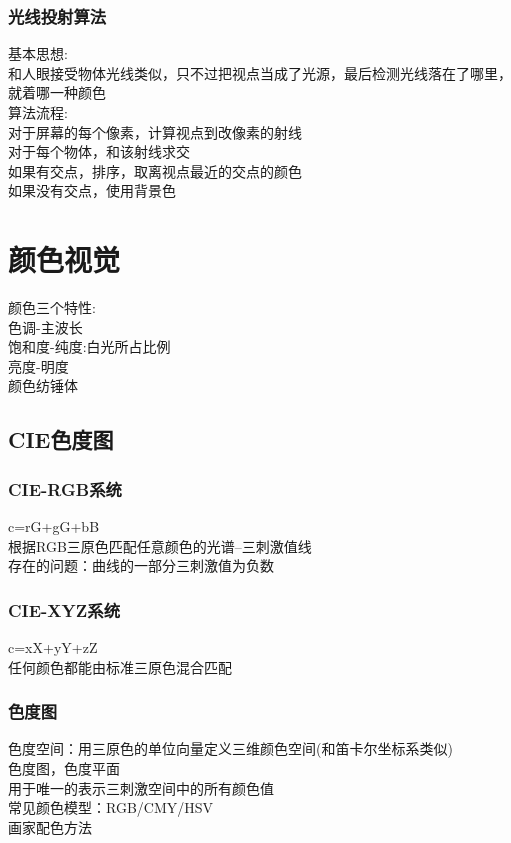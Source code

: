 \documentclass{article}
\begin{document}
\begin{CJK}{UTF8}{gbsn}
	\subsubsection{光线投射算法}
	基本思想:\\
	和人眼接受物体光线类似，只不过把视点当成了光源，最后检测光线落在了哪里，就着哪一种颜色\\
	算法流程:\\
	对于屏幕的每个像素，计算视点到改像素的射线\\
	对于每个物体，和该射线求交\\
	如果有交点，排序，取离视点最近的交点的颜色\\
	如果没有交点，使用背景色\\
	\section{颜色视觉}
	颜色三个特性:\\
	色调-主波长\\
	饱和度-纯度:白光所占比例\\
	亮度-明度\\
	颜色纺锤体\\
	\subsection{CIE色度图}
	\subsubsection{CIE-RGB系统}
	c=rG+gG+bB\\
	根据RGB三原色匹配任意颜色的光谱--三刺激值线\\
	存在的问题：曲线的一部分三刺激值为负数\\
	\subsubsection{CIE-XYZ系统}
	c=xX+yY+zZ\\
	任何颜色都能由标准三原色混合匹配\\
	\subsubsection{色度图}
	色度空间：用三原色的单位向量定义三维颜色空间(和笛卡尔坐标系类似)\\
	色度图，色度平面\\
	用于唯一的表示三刺激空间中的所有颜色值\\
	常见颜色模型：RGB/CMY/HSV\\
	画家配色方法\\

\end{CJK}
\end{document}

